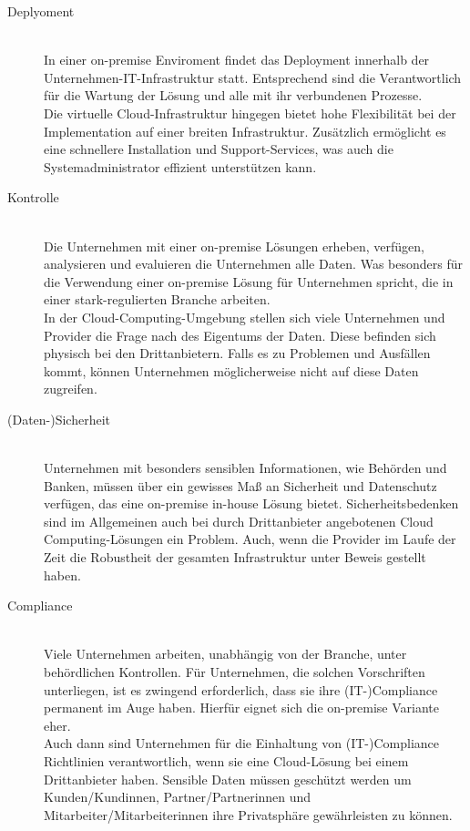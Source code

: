\begin{description}   
 \item [Deplyoment] \hfill \\
In einer on-premise Enviroment findet das Deployment innerhalb der Unternehmen-IT-Infrastruktur statt. Entsprechend sind die Verantwortlich für die Wartung der Lösung und alle mit ihr verbundenen Prozesse. \\Die virtuelle Cloud-Infrastruktur hingegen bietet hohe Flexibilität bei der Implementation auf einer  breiten Infrastruktur. Zusätzlich ermöglicht es eine schnellere Installation und Support-Services, was auch die Systemadministrator effizient unterstützen kann.\cite{bibi2012business}
 \item [Kontrolle] \hfill \\
Die Unternehmen mit einer on-premise Lösungen erheben, verfügen, analysieren und evaluieren die Unternehmen alle Daten. Was besonders für die Verwendung einer on-premise Lösung für Unternehmen spricht, die in einer stark-regulierten Branche arbeiten.\\
In der Cloud-Computing-Umgebung stellen sich viele Unternehmen und Provider die Frage nach des Eigentums der Daten. Diese befinden sich physisch bei den Drittanbietern. Falls es zu Problemen und Ausfällen kommt, können Unternehmen möglicherweise nicht auf diese Daten zugreifen.\cite{bibi2012business}
 \item [(Daten-)Sicherheit] \hfill \\
Unternehmen mit besonders sensiblen Informationen, wie Behörden und Banken, müssen über ein gewisses Maß an Sicherheit und Datenschutz verfügen, das eine on-premise in-house Lösung bietet.
Sicherheitsbedenken sind im Allgemeinen auch bei durch Drittanbieter angebotenen Cloud Computing-Lösungen ein Problem. Auch, wenn die Provider im Laufe der Zeit die Robustheit der gesamten Infrastruktur unter Beweis gestellt haben. \cite{klotz2008compliance} \cite{falk2012compliance}
 \item [Compliance] \hfill \\
Viele Unternehmen arbeiten, unabhängig von der Branche, unter behördlichen Kontrollen. Für Unternehmen, die solchen Vorschriften unterliegen, ist es zwingend erforderlich, dass sie ihre (IT-)Compliance permanent im Auge haben. Hierfür eignet sich die on-premise Variante eher. \\
Auch dann sind  Unternehmen für die Einhaltung von (IT-)Compliance Richtlinien verantwortlich, wenn sie eine Cloud-Lösung bei einem Drittanbieter haben. Sensible Daten müssen geschützt werden um Kunden/Kundinnen, Partner/Partnerinnen und Mitarbeiter/Mitarbeiterinnen  ihre Privatsphäre gewährleisten zu können.\cite{klotz2008compliance}
\end{description}
